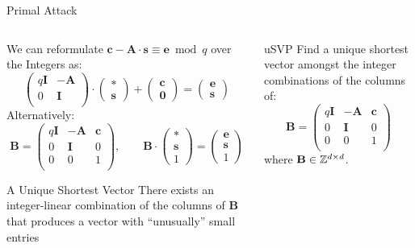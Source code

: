 \documentclass[xcolor=table,10pt,aspectratio=169]{beamer}
\renewcommand{\vec}[1]{\ensuremath{\mathbf{#1}}\xspace}
\providecommand{\mat}[1]{\ensuremath{\vec{#1}}\xspace}
\begin{document}
\begin{frame}[label={sec:orgc7f7a8b}]{Primal Attack}
\begin{columns}
\begin{column}[t]{0.7\columnwidth}
We can reformulate \(\vec{c} - \mat{A} \cdot \vec{s} \equiv \vec{e} \bmod q\)  over the Integers as:
\[
    \begin{pmatrix}q\mat{I} & -\mat{A}\\0 & \mat{I}\\\end{pmatrix}
  \cdot \begin{pmatrix}\vec{*}\\\vec{s}\end{pmatrix}
  + \begin{pmatrix}\vec{c}\\\vec{0}\end{pmatrix}
  = \begin{pmatrix}\vec{e}\\\vec{s}\end{pmatrix}
\]
Alternatively:
\[
  \mat{B} = \begin{pmatrix}q\mat{I} & -\mat{A} & \vec{c}\\
  0 & \mat{I} & 0\\
  0 & 0 & 1\\
  \end{pmatrix}
  , \qquad
  \mat{B}
  \cdot \begin{pmatrix}\vec{*}\\\vec{s}\\1\end{pmatrix}
  = \begin{pmatrix}\vec{e}\\\vec{s}\\1\end{pmatrix}
\]

\begin{block}{A Unique Shortest Vector}
There exists an integer-linear combination of the columns of \(\mat{B}\) that produces a vector with “unusually” small entries
\end{block}
\end{column}

\begin{column}[t]{0.3\columnwidth}
\begin{alertblock}{uSVP}
Find a unique shortest vector amongst the integer combinations of the columns of:
\[
  \mat{B} = \begin{pmatrix}
 q\mat{I} & -\mat{A} & \vec{c}\\
 0        & \mat{I}  & 0\\
 0        & 0        & 1\\
  \end{pmatrix}
\]
where \(\mat{B} \in \ZZ^{d \times d}\).
\end{alertblock}
\end{column}
\end{columns}
\end{frame}
\end{document}
